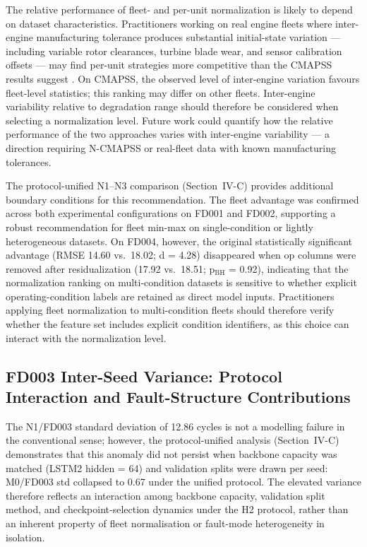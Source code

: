 \documentclass[preprint,10pt]{elsarticle}
\begin{document}
The relative performance of fleet- and per-unit normalization is likely to depend on dataset characteristics. Practitioners working on real engine fleets where inter-engine manufacturing tolerance produces substantial initial-state variation — including variable rotor clearances, turbine blade wear, and sensor calibration offsets — may find per-unit strategies more competitive than the CMAPSS results suggest \cite{ref29}. On CMAPSS, the observed level of inter-engine variation favours fleet-level statistics; this ranking may differ on other fleets. Inter-engine variability relative to degradation range should therefore be considered when selecting a normalization level. Future work could quantify how the relative performance of the two approaches varies with inter-engine variability --- a direction requiring N-CMAPSS or real-fleet data with known manufacturing tolerances.

The protocol-unified N1--N3 comparison (Section~IV-C) provides additional boundary conditions for this recommendation. The fleet advantage was confirmed across both experimental configurations on FD001 and FD002, supporting a robust recommendation for fleet min-max on single-condition or lightly heterogeneous datasets. On FD004, however, the original statistically significant advantage (RMSE 14.60 vs.\ 18.02; d = 4.28) disappeared when op columns were removed after residualization (17.92 vs.\ 18.51; p$_\text{BH}$ = 0.92), indicating that the normalization ranking on multi-condition datasets is sensitive to whether explicit operating-condition labels are retained as direct model inputs. Practitioners applying fleet normalization to multi-condition fleets should therefore verify whether the feature set includes explicit condition identifiers, as this choice can interact with the normalization level.

\subsection{FD003 Inter-Seed Variance: Protocol Interaction and Fault-Structure Contributions}

The N1/FD003 standard deviation of 12.86 cycles is not a modelling failure in the conventional sense; however, the protocol-unified analysis (Section~IV-C) demonstrates that this anomaly did not persist when backbone capacity was matched (LSTM2 hidden = 64) and validation splits were drawn per seed: M0/FD003 std collapsed to 0.67 under the unified protocol. The elevated variance therefore reflects an interaction among backbone capacity, validation split method, and checkpoint-selection dynamics under the H2 protocol, rather than an inherent property of fleet normalisation or fault-mode heterogeneity in isolation.
\end{document}
